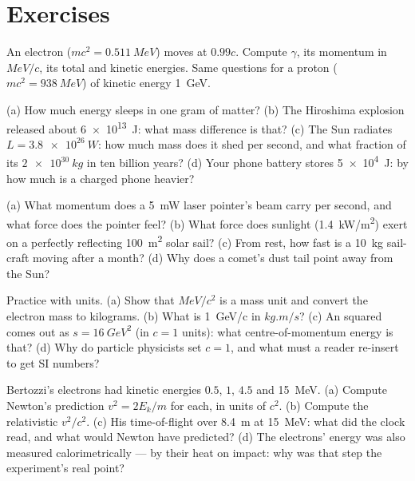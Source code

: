 \section{Exercises}

\begin{exercise}[$\star$]\label{exo:b3:relativistic-dynamics:1}
An electron ($mc^2 = \qty{0.511}{MeV}$) moves at $0.99c$. Compute
$\gamma$, its momentum in $\unit{MeV}/c$, its total and kinetic
energies. Same questions for a proton ($mc^2 = \qty{938}{MeV}$) of
kinetic energy \qty{1}{GeV}.
\end{exercise}

\begin{exercise}[$\star$]\label{exo:b3:relativistic-dynamics:2}
(a) How much energy sleeps in one gram of matter? (b) The Hiroshima
explosion released about \qty{6e13}{J}: what mass difference is that?
(c) The Sun radiates $L = \qty{3.8e26}{W}$: how much mass does it
shed per second, and what fraction of its $\qty{2e30}{kg}$ in ten
billion years? (d) Your phone battery stores \qty{5e4}{J}: by how
much is a charged phone heavier?
\end{exercise}

\begin{exercise}[$\star$]\label{exo:b3:relativistic-dynamics:3}
(a) What momentum does a \qty{5}{mW} laser pointer's beam carry per
second, and what force does the pointer feel? (b) What force does
sunlight (\qty{1.4}{kW/m^2}) exert on a perfectly reflecting
\qty{100}{m^2} solar sail? (c) From rest, how fast is a \qty{10}{kg}
sail-craft moving after a month? (d) Why does a comet's dust tail
point away from the Sun?
\end{exercise}

\begin{exercise}[$\star$]\label{exo:b3:relativistic-dynamics:4}
Practice with units. (a) Show that $\unit{MeV}/c^2$ is a mass unit
and convert the electron mass to kilograms. (b) What is
\qty{1}{GeV/c} in $\unit{kg.m/s}$? (c) An  squared
comes out as $s = \qty{16}{GeV^2}$ (in $c = 1$ units): what
centre-of-momentum energy is that? (d) Why do particle physicists set
$c = 1$, and what must a reader re-insert to get SI numbers?
\end{exercise}

\begin{exercise}[$\star\star$]\label{exo:b3:relativistic-dynamics:5}
Bertozzi's electrons had kinetic energies $0.5$, $1$, $4.5$ and
\qty{15}{MeV}. (a) Compute Newton's prediction $v^2 = 2E_k/m$ for
each, in units of $c^2$. (b) Compute the relativistic $v^2/c^2$. (c)
His time-of-flight over \qty{8.4}{m} at \qty{15}{MeV}: what did the
clock read, and what would Newton have predicted? (d) The electrons'
energy was also measured calorimetrically --- by their heat on
impact: why was that step the experiment's real point?
\end{exercise}

